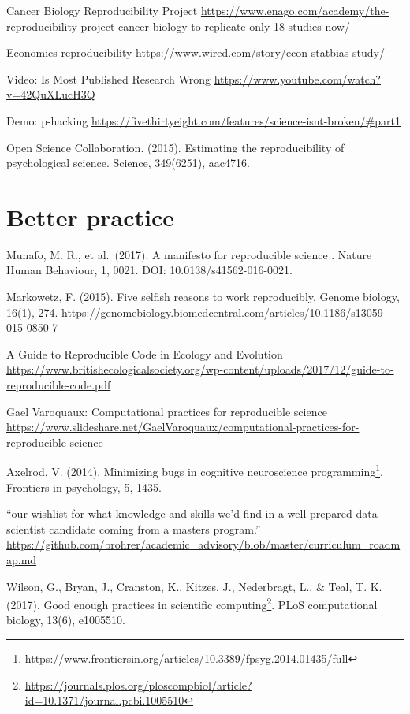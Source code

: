 \documentclass[
  12pt,
  a5paper,
]{book}
\DeclareRobustCommand{\href}[2]{#2\footnote{\url{#1}}}
\begin{document}
Cancer Biology Reproducibility Project
\url{https://www.enago.com/academy/the-reproducibility-project-cancer-biology-to-replicate-only-18-studies-now/}

Economics reproducibility
\url{https://www.wired.com/story/econ-statbias-study/}

Video: Is Most Published Research Wrong \url{https://www.youtube.com/watch?v=42QuXLucH3Q}

Demo: p-hacking \url{https://fivethirtyeight.com/features/science-isnt-broken/\#part1}

Open Science Collaboration. (2015). Estimating the reproducibility of psychological science. Science, 349(6251), aac4716.

\hypertarget{better-practice}{%
\section{Better practice}\label{better-practice}}

Munafo, M. R., et al.~(2017). A manifesto for reproducible science . Nature Human Behaviour, 1, 0021. DOI: 10.0138/s41562-016-0021.

Markowetz, F. (2015). Five selfish reasons to work reproducibly. Genome biology, 16(1), 274. \url{https://genomebiology.biomedcentral.com/articles/10.1186/s13059-015-0850-7}

A Guide to Reproducible Code in Ecology and Evolution \url{https://www.britishecologicalsociety.org/wp-content/uploads/2017/12/guide-to-reproducible-code.pdf}

Gael Varoquaux: Computational practices for reproducible science \url{https://www.slideshare.net/GaelVaroquaux/computational-practices-for-reproducible-science}

Axelrod, V. (2014). \href{https://www.frontiersin.org/articles/10.3389/fpsyg.2014.01435/full}{Minimizing bugs in cognitive neuroscience programming}. Frontiers in psychology, 5, 1435.

``our wishlist for what knowledge and skills we'd find in a well-prepared data scientist candidate coming from a masters program.'' \url{https://github.com/brohrer/academic_advisory/blob/master/curriculum_roadmap.md}

Wilson, G., Bryan, J., Cranston, K., Kitzes, J., Nederbragt, L., \& Teal, T. K. (2017). \href{https://journals.plos.org/ploscompbiol/article?id=10.1371/journal.pcbi.1005510}{Good enough practices in scientific computing}. PLoS computational biology, 13(6), e1005510.
\end{document}
